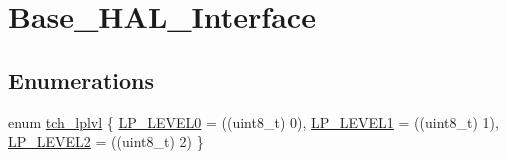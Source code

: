 \hypertarget{group___base___h_a_l___interface}{\section{Base\+\_\+\+H\+A\+L\+\_\+\+Interface}
\label{group___base___h_a_l___interface}
}
\subsection*{Enumerations}
\begin{DoxyCompactItemize}
\item 
enum \hyperlink{group___base___h_a_l___interface_gafff60314f6cfca2764c81a05e4e4fb45}{tch\+\_\+lplvl} \{ \hyperlink{group___base___h_a_l___interface_ggafff60314f6cfca2764c81a05e4e4fb45a1a4333aa3688f64c29a727e438e71c93}{L\+P\+\_\+\+L\+E\+V\+E\+L0} = ((uint8\+\_\+t) 0), 
\hyperlink{group___base___h_a_l___interface_ggafff60314f6cfca2764c81a05e4e4fb45a6f509976d66ef467eef416cdb8b96df5}{L\+P\+\_\+\+L\+E\+V\+E\+L1} = ((uint8\+\_\+t) 1), 
\hyperlink{group___base___h_a_l___interface_ggafff60314f6cfca2764c81a05e4e4fb45acc47fd7af8a7daaf49270756b185a2b2}{L\+P\+\_\+\+L\+E\+V\+E\+L2} = ((uint8\+\_\+t) 2)
 \}
\end{DoxyCompactItemize}
